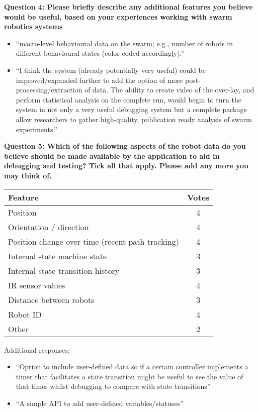 \vspace{1cm}

\textbf{Question 4: Please briefly describe any additional features you believe would be useful, based on your experiences working with swarm robotics systems}

\begin{itemize}
\item ``macro-level behavioural data on the swarm; e.g., number of robots in different behavioural states (color coded accordingly).''
\item ``I think the system (already potentially very useful) could be improved/expanded further to add the option of more post-processing/extraction of data. The ability to create video of the over-lay, and perform statistical analysis on the complete run, would begin to turn the system in not only a very useful debugging system but a complete package allow researchers to gather high-quality, publication ready analysis of swarm experiments.''
\end{itemize}

\vspace{2cm}

\textbf{Question 5: Which of the following aspects of the robot data do you believe should be made available by the application to aid in debugging and testing? Tick all that apply. Please add any more you may think of.}

\begin{center}
\begin{tabular}{ p{10cm} c }
 Feature & Votes\\ 
 \hline
 Position & 4\\
 Orientation / direction & 4\\
 Position change over time (recent path tracking) & 4\\
 Internal state machine state & 3\\
 Internal state transition history & 3\\
 IR sensor values & 4\\
 Distance between robots & 3\\
 Robot ID & 4\\
 Other & 2\\
\end{tabular}
\end{center}

Additional responses:

\begin{itemize}
\item ``Option to include user-defined data so if a certain controller implements a timer that facilitates a state transition might be useful to see the value of that timer whilst debugging to compare with state transitions''
\item ``A simple API to add user-defined variables/statuses''
\end{itemize}

